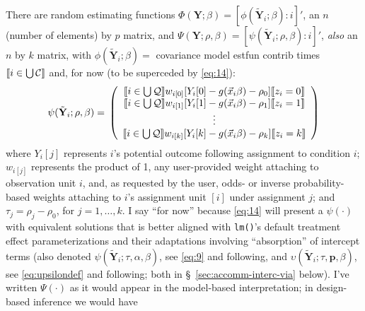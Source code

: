 \documentclass{article}
\DeclarePairedDelimiter{\indicator}{\llbracket}{\rrbracket}
\newcommand{\owt}[1][z_i]{\ensuremath{w_{i[#1]}}}
\begin{document}
There are random estimating functions $\Phi(\mathbf{Y}; \beta ) =
[\phi(\tilde{\mathbf{Y}}_{i};
\beta) : i]'$, an $n$ (number of elements) by $p$ matrix,  and 
       $\Psi(\mathbf{Y}; \rho, \beta) = [\psi(\tilde{\mathbf{Y}}_{i};
       \rho, \beta): i]'$, \textit{also} an $n$ by $k$ matrix, with 
       $\phi(\tilde{\mathbf{Y}}_{i}; \beta)=$ covariance model estfun
       contrib times $\indicator{i \in \bigcup \mathcal{C}}$ and, for
       now (to be superceded by \eqref{eq:14}):
\begin{equation}
         \label{eq:5}
         \psi(\tilde{\mathbf{Y}}_{i}; \rho, \beta) =\\
         \left( \begin{array}{c}
           \indicator{i \in \bigcup \mathcal{Q}}\owt[0] [Y_{i}[0] - g(\vec{x}_{i}\beta)-
                  \rho_{0}]\indicator{z_{i}=0}\\
           \indicator{i \in \bigcup \mathcal{Q}}\owt[1] [Y_{i}[1] - g(\vec{x}_{i}\beta)-
                  \rho_{1}]\indicator{z_{i}=1}\\
                  \vdots \\
           \indicator{i \in \bigcup \mathcal{Q}}\owt[k] [Y_{i}[k] - g(\vec{x}_{i}\beta)-
                  \rho_{k}]\indicator{z_{i}=k}\\
                \end{array}\right)
\end{equation}
where $Y_{i}[j]$ represents $i$'s potential outcome following
assignment to condition $i$; $\owt[j]$ represents the product of 1, any user-provided weight attaching to observation unit $i$, and, as requested by the user, odds- or inverse probability-based weights attaching to $i$'s assignment unit $[i]$ under assignment $j$; and $\tau_{j} = \rho_{j}-\rho_{0}$, for $j=1,
\ldots, k$. I say ``for now'' because \eqref{eq:14} will present a
$\psi(\cdot)$ with equivalent solutions that is better aligned with
\texttt{lm()}'s default treatment effect parameterizations and their
adaptations involving ``absorption'' of intercept terms (also denoted $\psi(\tilde{\mathbf{Y}}_{i}; \tau, \alpha, \beta)$, see \eqref{eq:9} and following, and $\upsilon(\tilde{\mathbf{Y}}_{i}; \tau, \mathbf{p}, \beta)$, see \eqref{eq:upsilondef} and following; both in \S~\ref{sec:accomm-interc-via} below).  I've written ${\Psi}(\cdot)$ as
it would appear in the model-based interpretation; in design-based
inference we would have
\end{document}
